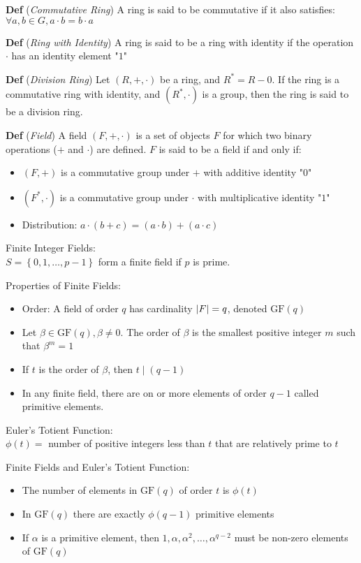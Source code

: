 \documentclass[12pt,landscape]{article}
\newcommand{\tab}{\hspace{.02\textwidth}}
\newcommand{\defn}[1]{\textbf{Def} (\emph{#1})}
\newcommand{\set}[1]{\left\{ #1 \right\}}
\newcommand{\gf}[1]{\text{GF}(#1)}
\begin{document}
\begin{multicols}{3}
\defn{Commutative Ring} A ring is said to be commutative if it also satisfies: $\forall a,b \in G, a \cdot b = b \cdot a$

\defn{Ring with Identity} A ring is said to be a ring with identity if the operation $\cdot$ has an identity element "$1$"

\defn{Division Ring} Let $(R, +, \cdot)$ be a ring, and $R^* = R - {0}$. If the ring is a commutative ring with identity, and $(R^*, \cdot)$ is a group, then the ring is said to be a division ring.

\defn{Field} A field $(F, +, \cdot)$ is a set of objects $F$ for which two binary operations ($+$ and $\cdot$) are defined. $F$ is said to be a field if and only if:
\begin{itemize}
    \item $(F,+)$ is a commutative group under $+$ with additive identity "$0$"
    \item $(F^*, \cdot)$ is a commutative group under $\cdot$ with multiplicative identity "$1$"
    \item Distribution: $a \cdot (b + c) = (a \cdot b) + (a \cdot c)$
\end{itemize}

Finite Integer Fields:\\
\tab $S = \set{0, 1, \ldots, p - 1}$ form a finite field if $p$ is prime.

Properties of Finite Fields:\\
\begin{itemize}
    \item Order: A field of order $q$ has cardinality $\abs{F} = q$, denoted $\gf{q}$
    \item Let $\beta \in \gf{q}, \beta \neq 0$. The order of $\beta$ is the smallest positive integer $m$ such that $\beta^m = 1$
    \item If $t$ is the order of $\beta$, then $t \mid (q - 1)$
    \item In any finite field, there are on or more elements of order $q-1$ called primitive elements.
\end{itemize}

Euler's Totient Function:\\
\tab $\phi(t) =$ number of positive integers less than $t$ that are relatively prime to $t$

Finite Fields and Euler's Totient Function:\\
\begin{itemize}
    \item The number of elements in $\gf{q}$ of order $t$ is $\phi(t)$
    \item In $\gf{q}$ there are exactly $\phi(q - 1)$ primitive elements
    \item If $\alpha$ is a primitive element, then $1, \alpha, \alpha^2, \ldots, \alpha^{q-2}$ must be non-zero elements of $\gf{q}$
\end{itemize}


\end{multicols}
\end{document}

